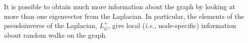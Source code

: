 \documentclass[12pt]{article}
\theoremstyle{plain}
\begin{document}

It is possible to obtain much 
more information about the graph by looking at more than one eigenvector 
from the Laplacian.  
In particular, the elements of the pseudoinverse of the Laplacian, 
$L_{G}^{+}$, give local (\emph{i.e.}, node-specific) information about random
walks on the graph.
\end{document}
